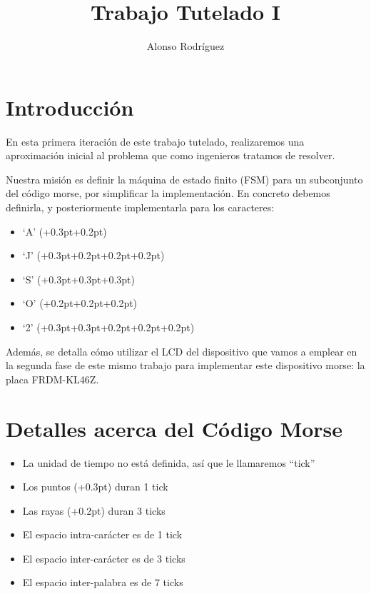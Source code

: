 \documentclass[a4paper,openright,12pt]{article}
\newcommand{\punto}{\kern+0.3pt\raisebox{0.35ex}{\huge\textbf.}}
\newcommand{\raya}{\kern+0.2pt\raisebox{-0.35ex}{\huge\textbf-}}
\begin{document}
\author {Alonso Rodríguez}
\title {Trabajo Tutelado I}

\maketitle

\justifying{}

\section{Introducción}
En esta primera iteración de este trabajo tutelado, realizaremos una aproximación inicial al problema que como ingenieros
tratamos de resolver.

Nuestra misión es definir la máquina de estado finito (FSM) para un subconjunto del código morse, por simplificar la implementación.
En concreto debemos definirla, y posteriormente implementarla para los caracteres:
\begin{itemize}
    \item `A' (\punto\raya)
    \item `J' (\punto\raya\raya\raya)
    \item `S' (\punto\punto\punto)
    \item `O' (\raya\raya\raya)
    \item `2' (\punto\punto\raya\raya\raya)
\end{itemize} 

Además, se detalla cómo utilizar el LCD del dispositivo que vamos a emplear en la segunda fase de este mismo trabajo para implementar este dispositivo morse:
la placa FRDM-KL46Z.

\section{Detalles acerca del Código Morse}
\begin{itemize}
    \item La unidad de tiempo no está definida, así que le llamaremos ``tick''
    \item Los puntos (\punto) duran 1 tick
    \item Las rayas (\raya) duran 3 ticks
    \item El espacio intra-carácter es de 1 tick
    \item El espacio inter-carácter es de 3 ticks
    \item El espacio inter-palabra es de 7 ticks
\end{itemize}
\end{document}

